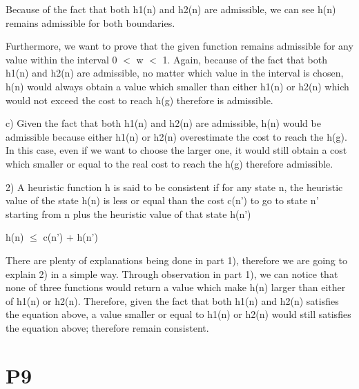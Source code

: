 \documentclass{article}
\begin{document}
Because of the fact that both h{\small 1(n)} and h{\small 2(n)} are admissible, we can see h{\small(n)} remains admissible for both boundaries.

Furthermore, we want to prove that the given function remains admissible for any value within the interval 0 $<$ w $<$ 1. Again, because of the fact that both h{\small 1(n)} and h{\small 2(n)} are admissible, no matter which value in the interval is chosen,  h{\small (n)} would always obtain a value which smaller than either h{\small 1(n)} or h{\small 2(n)} which would not exceed the cost to reach h{\small (g)} therefore is admissible.

c) Given the fact that both h{\small 1(n)} and h{\small 2(n)} are admissible, h{\small (n)} would be admissible because either h{\small 1(n)} or h{\small 2(n)} overestimate the cost to reach the h{\small (g)}. In this case, even if we want to choose the larger one, it would still obtain a cost which smaller or equal to the real cost to reach the h{\small (g)} therefore admissible.

\vspace{5mm}

2) A heuristic function h is said to be consistent if for any state n, the heuristic value of the state h{\small(n)} is less or equal than the cost c{\small(n')} to go to state n' starting from n plus the heuristic value of that state h{\small(n')}

\begin{center}

h{\small(n)} $\le$ c{\small(n')} + h{\small(n')}

\end{center}

There are plenty of explanations being done in part 1), therefore we are going to explain 2) in a simple way. Through observation in part 1), we can notice that none of three functions would return a value which make h{\small(n)} larger than either of h{\small1(n)} or h{\small2(n)}. Therefore, given the fact that both h{\small 1(n)} and h{\small 2(n)} satisfies the equation above, a value smaller or equal to h{\small 1(n)} or h{\small 2(n)} would still satisfies the equation above; therefore remain consistent.

\section*{P9}

\hspace{5mm} 
\end{document}
